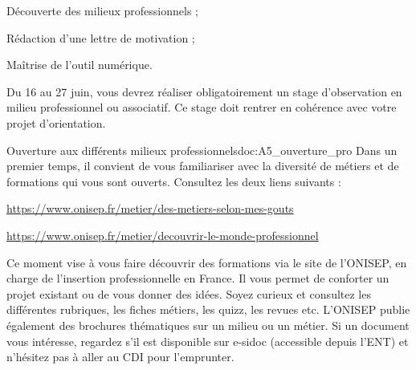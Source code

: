 \teteSndAP
{}

\begin{objectifs}
  \item Découverte des milieux professionnels ;
  \item Rédaction d’une lettre de motivation ;
  \item Maîtrise de l’outil numérique.
\end{objectifs}
\medskip

\begin{contexte}
  Du 16 au 27 juin, vous devrez réaliser obligatoirement un stage d’observation en milieu professionnel ou associatif. Ce stage doit rentrer en cohérence avec votre projet d’orientation.
\end{contexte}
\medskip

\begin{doc}{Ouverture aux différents milieux professionnels}{doc:A5_ouverture_pro}
  Dans un premier temps, il convient de vous familiariser avec la diversité de métiers et de formations qui vous sont ouverts.
  Consultez les deux liens suivants :
  \begin{listePoints}
    \item \url{https://www.onisep.fr/metier/des-metiers-selon-mes-gouts} 
    \item \url{https://www.onisep.fr/metier/decouvrir-le-monde-professionnel}
  \end{listePoints}
  Ce moment vise à vous faire découvrir des formations via le site de l’ONISEP, en charge de l’insertion professionnelle en France. Il vous permet de conforter un projet existant ou de vous donner des idées.
  Soyez curieux et consultez les différentes rubriques, les fiches métiers, les quizz, les revues etc.
  L’ONISEP publie également des brochures thématiques sur un milieu ou un métier. Si un document vous intéresse, regardez s’il est disponible sur e-sidoc (accessible depuis l’ENT) et n’hésitez pas à aller au CDI pour l’emprunter. 
\end{doc}

